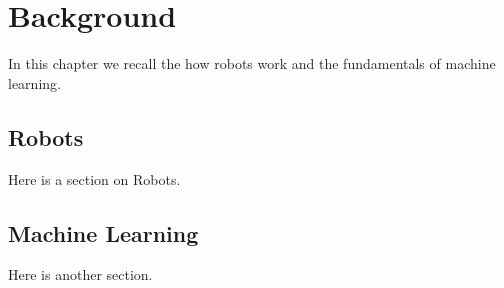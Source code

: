 \chapter{Background}
\label{chap:background}

In this chapter we recall the how robots work and the fundamentals of
machine learning.

\section{Robots}

Here is a section on Robots.

\section{Machine Learning}

Here is another section.

